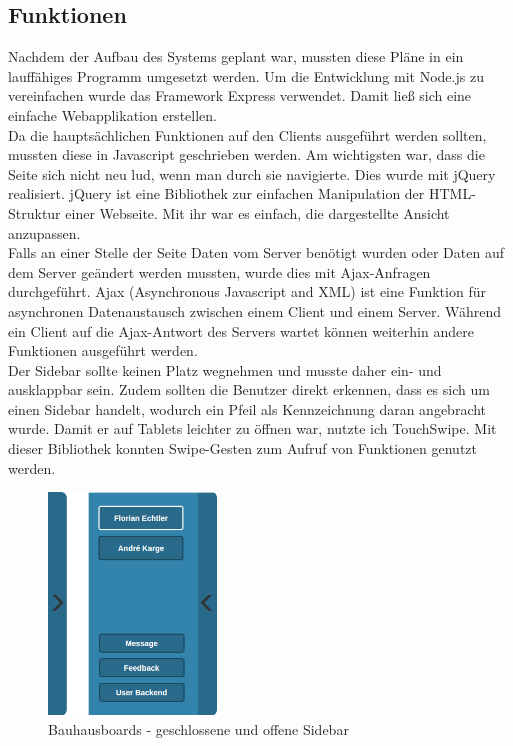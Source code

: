 \subsection{Funktionen}\label{Funktionen}
Nachdem der Aufbau des Systems geplant war, mussten diese Pläne in ein lauffähiges Programm umgesetzt werden.
Um die Entwicklung mit Node.js zu vereinfachen wurde das Framework Express\cite{express:website} verwendet. Damit ließ sich eine einfache Webapplikation erstellen.
\\
Da die hauptsächlichen Funktionen auf den Clients ausgeführt werden sollten, mussten diese in Javascript geschrieben werden.
Am wichtigsten war, dass die Seite sich nicht neu lud, wenn man durch sie navigierte. Dies wurde mit jQuery\cite{jquery:website} realisiert. jQuery ist eine Bibliothek zur einfachen Manipulation der HTML-Struktur einer Webseite. Mit ihr war es einfach, die dargestellte Ansicht anzupassen.
\\
Falls an einer Stelle der Seite Daten vom Server benötigt wurden oder Daten auf dem Server geändert werden mussten, wurde dies mit Ajax-Anfragen durchgeführt. Ajax (Asynchronous Javascript and XML) ist eine Funktion für asynchronen Datenaustausch zwischen einem Client und einem Server.
Während ein Client auf die Ajax-Antwort des Servers wartet können weiterhin andere Funktionen ausgeführt werden.
\\
Der Sidebar sollte keinen Platz wegnehmen und musste daher ein- und ausklappbar sein. Zudem sollten die Benutzer direkt erkennen, dass es sich um einen Sidebar handelt, wodurch ein Pfeil als Kennzeichnung daran angebracht wurde.
Damit er auf Tablets leichter zu öffnen war, nutzte ich TouchSwipe\cite{touchswipe:website}. Mit dieser Bibliothek konnten Swipe-Gesten zum Aufruf von Funktionen genutzt werden.
\begin{figure}[h!]
  \centering
    \includegraphics[width=0.4\textwidth]{./img/Sidebar.png}
  \caption{Bauhausboards - geschlossene und offene Sidebar}
  \label{img:sidebar}
\end{figure}
